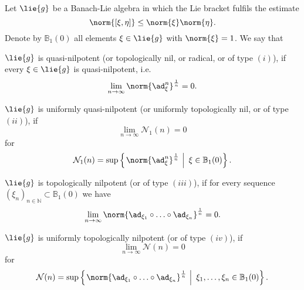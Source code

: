 \documentclass[
11pt,                          %
english                        %
]{article}
\begin{document}
\begin{definition}
	\label{def:nilpotencies}
	Let $\lie{g}$ be a Banach-Lie algebra in which the Lie bracket fulfils the 
	estimate
	\begin{equation*}
		\norm{ [\xi, \eta] }
		\leq
		\norm{\xi}
		\norm{\eta}.
	\end{equation*}
	Denote by $\mathbb{B}_1(0)$ all elements $\xi \in \lie{g}$ with 
	$\norm{\xi} = 1$. We say that
	\begin{definitionlist}
		\item
		$\lie{g}$ is quasi-nilpotent (or topologically nil, or radical, or 
		of type $(i)$), if every $\xi \in \lie{g}$ is quasi-nilpotent, i.e.
		\begin{equation*}
			\lim_{n \rightarrow \infty}
			\norm{\ad_{\xi}^n}^{\frac{1}{n}}
			=
			0.
		\end{equation*}
		
		\item
		$\lie{g}$ is uniformly quasi-nilpotent (or uniformly topologically nil, or 
		of type $(ii)$), if
		\begin{equation*}
			\lim_{n \rightarrow \infty}
			\mathcal{N}_1(n)
			=
			0
		\end{equation*}
		for
		\begin{equation}
			\mathcal{N}_1(n)
			=
			\sup \left\{ 
			\left.
				\norm{ \ad_{\xi}^n}^{\frac{1}{n}} 
			\ \right| \
				\xi \in \mathbb{B}_1(0)
			\right\}.
		\end{equation}
		
		\item
		$\lie{g}$ is topologically nilpotent (or of type 
		$(iii)$), if for every sequence
		$(\xi_n)_{n \in \mathbb{N}} \subset \mathbb{B}_1(0)$ we have
		\begin{equation*}
			\lim_{n \rightarrow \infty}
			\norm{ 
				\ad_{\xi_1} \circ \ldots \circ \ad_{\xi_n}
			}^{\frac{1}{n}}
			=
			0.
		\end{equation*}
		
		\item
		$\lie{g}$ is uniformly topologically nilpotent (or of 
		type $(iv)$), if
		\begin{equation*}
			\lim_{n \rightarrow \infty}
			\mathcal{N}(n)
			=
			0
		\end{equation*}
		for
		\begin{equation}
			\mathcal{N}(n)
			=
			\sup \left\{ 
			\left.
				\norm{ 
					\ad_{\xi_1} \circ \ldots \circ \ad_{\xi_n}
				}^{\frac{1}{n}} 
			\ \right| \
				\xi_1, \ldots, \xi_n \in \mathbb{B}_1(0)
			\right\}.
		\end{equation}
	\end{definitionlist}
\end{definition}
\end{document}
